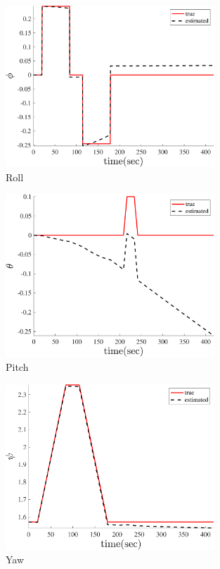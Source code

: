 \begin{figure}
    \centering
    \includegraphics[width=0.7\textwidth]{../Figure/Q5/phi_lin}
    \caption{Roll}
\end{figure}
\begin{figure}
    \centering
    \includegraphics[width=0.7\textwidth]{../Figure/Q5/theta_lin}
    \caption{Pitch}
\end{figure}
\begin{figure}
    \centering
    \includegraphics[width=0.7\textwidth]{../Figure/Q5/psi_lin}
    \caption{Yaw}
\end{figure}


